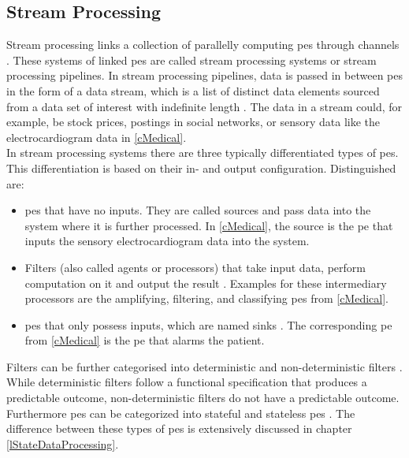 \subsection{Stream Processing}
\label{lStreamProcessing}
Stream processing links a collection of parallelly computing \gls{pe}s through channels \cite{Stephens.1997}. These systems of linked \gls{pe}s are called stream processing systems \cite{Stephens.1997} or stream processing pipelines. In stream processing pipelines, data is passed in between \gls{pe}s in the form of a data stream, which is a list of distinct data elements sourced from a data set of interest with indefinite length \cite{Stephens.1997}. The data in a stream could, for example, be stock prices, postings in social networks, or sensory data \cite{Hesse.2015} like the electrocardiogram data in \ref{cMedical}.\\
In stream processing systems there are three typically differentiated types of \gls{pe}s. This differentiation is based on their in- and output configuration. Distinguished are:
\begin{itemize}
    \item \gls{pe}s that have no inputs. They are called sources \cite{Stephens.1997} and pass data into the system where it is further processed. In \ref{cMedical}, the source is the \gls{pe} that inputs the sensory electrocardiogram data into the system.
    \item Filters (also called agents or processors) that take input data, perform computation on it and output the result \cite{Stephens.1997}. Examples for these intermediary processors are the amplifying, filtering, and classifying \gls{pe}s from \ref{cMedical}.
    \item \gls{pe}s that only possess inputs, which are named sinks \cite{Stephens.1997}. The corresponding \gls{pe} from \ref{cMedical} is the \gls{pe} that alarms the patient.
\end{itemize}

Filters can be further categorised into deterministic and non-deterministic filters \cite{Stephens.1997}. While deterministic filters follow a functional specification that produces a predictable outcome, non-deterministic filters do not have a predictable outcome.\\
Furthermore \gls{pe}s can be categorized into stateful and stateless \gls{pe}s \cite{CastroFernandez.2013}. The difference between these types of \gls{pe}s is extensively discussed in chapter \ref{lStateDataProcessing}.

